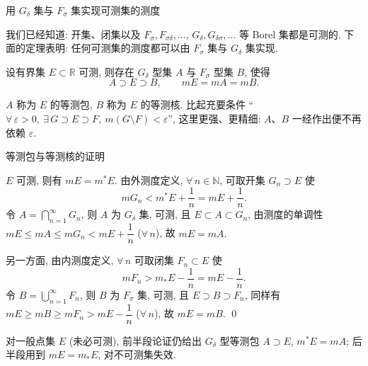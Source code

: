 
\begin{frame}{用 $G_\delta$ 集与 $F_\sigma$ 集实现可测集的测度}

我们已经知道: 开集、闭集以及 $F_\sigma, F_{\sigma\delta}, \ldots$, $G_\delta, G_{\delta\sigma}, \ldots$ 等 Borel 集都是可测的. 下面的定理表明: \alert{任何可测集的测度都可以由 $F_\sigma$ 集与 $G_\delta$ 集实现}.

\pause

\begin{thm}[等测包与等测核]
设有界集 $E \subset \mathbb{R}$ 可测, 则存在 $G_\delta$ 型集 $A$ 与 $F_\sigma$ 型集 $B$, 使得
\[
A \supset E \supset B, \qquad mE = mA = mB .
\]
\end{thm}

\pause

\begin{remark}
$A$ 称为 $E$ 的\alert{等测包}, $B$ 称为 $E$ 的\alert{等测核}. 比起充要条件 ``$\forall\, \varepsilon > 0,\ \exists\, G \supset E \supset F,\ m(G \setminus F) < \varepsilon$'', 这里更强、更精细: $A$、$B$ 一经作出便不再依赖 $\varepsilon$.
\end{remark}

\end{frame}


\begin{frame}{等测包与等测核的证明}

$E$ 可测, 则有 $mE = m^* E$. 由外测度定义, $\forall\, n \in \mathbb{N}$, 可取开集 $G_n \supset E$ 使
\[
mG_n < m^* E + \dfrac{1}{n} = mE + \dfrac{1}{n}.
\]
令 $A = \bigcap_{n=1}^\infty G_n$, 则 $A$ 为 $G_\delta$ 集, 可测, 且 $E \subset A \subset G_n$, 由测度的单调性 $mE \leqslant mA \leqslant mG_n < mE + \dfrac{1}{n}$ ($\forall\, n$), 故 $mE = mA.$

\pause

另一方面, 由内测度定义, $\forall\, n$ 可取闭集 $F_n \subset E$ 使
\[
mF_n > m_* E - \dfrac{1}{n} = mE - \dfrac{1}{n}.
\]
令 $B = \bigcup_{n=1}^\infty F_n$, 则 $B$ 为 $F_\sigma$ 集, 可测, 且 $E \supset B \supset F_n$, 同样有 $mE \geqslant mB \geqslant mF_n > mE - \dfrac{1}{n}$ ($\forall\, n$), 故 $mE = mB.$
\qed

\pause

\begin{remark}
对\alert{一般点集} $E$ (未必可测), 前半段论证仍给出 $G_\delta$ 型等测包 $A \supset E$, $m^* E = mA$; 后半段用到 $mE = m_* E$, 对不可测集失效.
\end{remark}

\end{frame}

